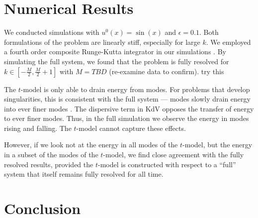 \documentclass{article}
\begin{document}
\section{Numerical Results}

We conducted simulations with $u^0(x) = \sin(x)$ and $\epsilon = 0.1$. Both formulations of the problem are linearly stiff, especially for large $k$. We employed a fourth order composite Runge-Kutta integrator in our simulations \cite{driscoll2002composite}. By simulating the full system, we found that the problem is fully resolved for $k\in \left[-\frac{M}{2},\frac{M}{2}+1\right]$ with $M=TBD$ (re-examine data to confirm). try this

The $t$-model is only able to drain energy from modes. For problems that develop singularities, this  is consistent with the full system --- modes slowly drain energy into ever finer modes \cite{stinis2012numerical}. The dispersive term in KdV opposes the transfer of energy to ever finer modes. Thus, in the full simulation we observe the energy in modes rising and falling. The $t$-model cannot capture these effects.

However, if we look not at the energy in all modes of the $t$-model, but the energy in a subset of the modes of the $t$-model, we find close agreement with the fully resolved results, provided the $t$-model is constructed with respect to a ``full'' system that itself remains fully resolved for all time.

\section{Conclusion}



\newpage



\end{document}
